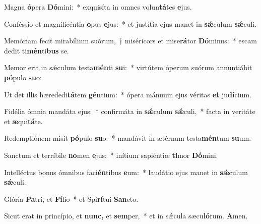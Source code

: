 \item Magna \textbf{ó}pera \textbf{Dó}mini:~* exquisíta in omnes volun\textbf{tá}tes \textbf{e}jus.
\item Conféssio et magnificéntia \textbf{o}pus \textbf{e}jus:~* et justítia ejus manet in \textbf{sǽ}culum \textbf{sǽ}culi.
\item Memóriam fecit mirabílium suórum,~† miséricors et mise\textbf{rá}tor \textbf{Dó}minus:~* escam dedit ti\textbf{mén}ti\textbf{bus} se.
\item Memor erit in sǽculum testa\textbf{mén}ti \textbf{su}i:~* virtútem óperum suórum annuntiábit \textbf{pó}pulo \textbf{su}o:
\item Ut det illis hærededi\textbf{tá}tem \textbf{gén}tium:~* ópera mánuum ejus véritas \textbf{et} ju\textbf{dí}cium.
\item Fidélia ómnia mandáta ejus:~† confirmáta in \textbf{sǽ}culum \textbf{sǽ}culi,~* facta in veritáte et \textbf{æ}qui\textbf{tá}te.
\item Redemptiónem misit \textbf{pó}pulo \textbf{su}o:~* mandávit in ætérnum testa\textbf{mén}tum \textbf{su}um.
\item Sanctum et terríbile \textbf{no}men \textbf{e}jus:~* inítium sapiéntiæ \textbf{ti}mor \textbf{Dó}mini.
\item Intelléctus bonus ómnibus faci\textbf{én}tibus \textbf{e}um:~* laudátio ejus manet in \textbf{sǽ}culum \textbf{sǽ}culi.
\item Glória \textbf{Pa}tri, et \textbf{Fí}lio~* et Spi\textbf{rí}tui \textbf{San}cto.
\item Sicut erat in princípio, et \textbf{nunc,} et \textbf{sem}per,~* et in sǽcula sæcu\textbf{ló}rum. \textbf{A}men.
